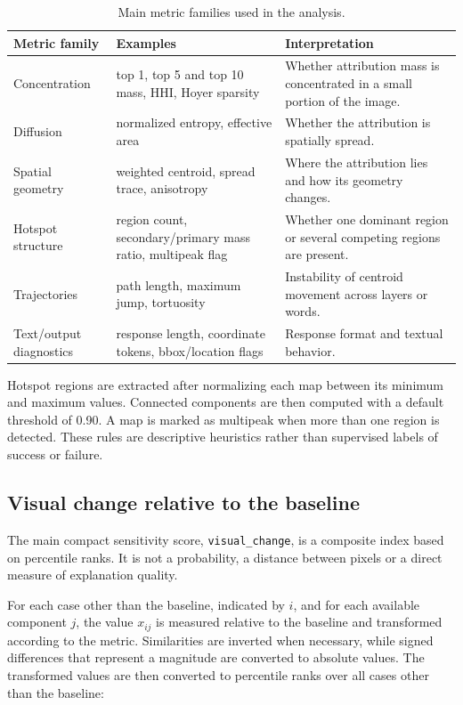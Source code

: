 \documentclass[11pt,a4paper]{article}
\newcommand{\code}[1]{\texttt{\small #1}}
\begin{document}
\begin{table}[H]
\centering
\small
\begin{tabularx}{\linewidth}{Z Y Y}
\toprule
Metric family & Examples & Interpretation \\
\midrule
Concentration & top 1, top 5 and top 10 mass, HHI, Hoyer sparsity & Whether attribution mass is concentrated in a small portion of the image. \\
Diffusion & normalized entropy, effective area & Whether the attribution is spatially spread. \\
Spatial geometry & weighted centroid, spread trace, anisotropy & Where the attribution lies and how its geometry changes. \\
Hotspot structure & region count, secondary/primary mass ratio, multipeak flag & Whether one dominant region or several competing regions are present. \\
Trajectories & path length, maximum jump, tortuosity & Instability of centroid movement across layers or words. \\
Text/output diagnostics & response length, coordinate tokens, bbox/location flags & Response format and textual behavior. \\
\bottomrule
\end{tabularx}
\caption{Main metric families used in the analysis.}
\label{tab:metrics}
\end{table}

Hotspot regions are extracted after normalizing each map between its minimum and maximum values. Connected components are then computed with a default threshold of 0.90. A map is marked as multipeak when more than one region is detected. These rules are descriptive heuristics rather than supervised labels of success or failure.

\subsection{Visual change relative to the baseline}

The main compact sensitivity score, \code{visual\_change}, is a composite index based on percentile ranks. It is not a probability, a distance between pixels or a direct measure of explanation quality.

For each case other than the baseline, indicated by $i$, and for each available component $j$, the value $x_{ij}$ is measured relative to the baseline and transformed according to the metric. Similarities are inverted when necessary, while signed differences that represent a magnitude are converted to absolute values. The transformed values are then converted to percentile ranks over all cases other than the baseline:
\end{document}
